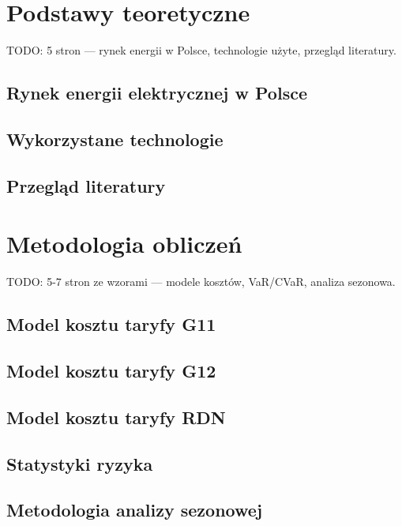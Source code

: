 \documentclass[12pt,twoside]{article}
\begin{document}
\section{Podstawy teoretyczne}

TODO: 5 stron — rynek energii w Polsce, technologie użyte, przegląd literatury.

\subsection{Rynek energii elektrycznej w Polsce}
\subsection{Wykorzystane technologie}
\subsection{Przegląd literatury}


\section{Metodologia obliczeń}

TODO: 5-7 stron ze wzorami — modele kosztów, VaR/CVaR, analiza sezonowa.

\subsection{Model kosztu taryfy G11}
\subsection{Model kosztu taryfy G12}
\subsection{Model kosztu taryfy RDN}
\subsection{Statystyki ryzyka}
\subsection{Metodologia analizy sezonowej}
\end{document}
